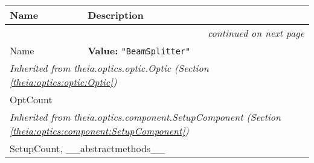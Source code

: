     \vspace{-1cm}
\hspace{\varindent}\begin{longtable}{|p{\varnamewidth}|p{\vardescrwidth}|l}
\cline{1-2}
\cline{1-2} \centering \textbf{Name} & \centering \textbf{Description}& \\
\cline{1-2}
\endhead\cline{1-2}\multicolumn{3}{r}{\small\textit{continued on next page}}\\\endfoot\cline{1-2}
\endlastfoot\raggedright N\-a\-m\-e\- & \raggedright \textbf{Value:} 
{\tt "BeamSplitter"}&\\
\cline{1-2}
\multicolumn{2}{|l|}{\textit{Inherited from theia.optics.optic.Optic \textit{(Section \ref{theia:optics:optic:Optic})}}}\\
\multicolumn{2}{|p{\varwidth}|}{\raggedright OptCount}\\
\cline{1-2}
\multicolumn{2}{|l|}{\textit{Inherited from theia.optics.component.SetupComponent \textit{(Section \ref{theia:optics:component:SetupComponent})}}}\\
\multicolumn{2}{|p{\varwidth}|}{\raggedright SetupCount, \_\_abstractmethods\_\_}\\
\cline{1-2}
\end{longtable}

